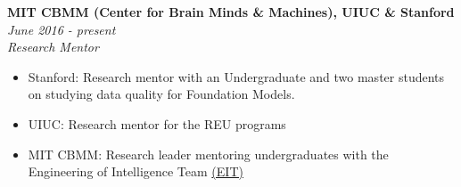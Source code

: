 \documentclass{article}
\newenvironment{changemargin}[2]{%
  \begin{list}{}{%
    \setlength{\topsep}{0pt}%
    \setlength{\leftmargin}{#1}%
    \setlength{\rightmargin}{#2}%
    \setlength{\listparindent}{\parindent}%
    \setlength{\itemindent}{\parindent}%
    \setlength{\parsep}{\parskip}%
  }%
  \item[]}{\end{list}
}
\newenvironment{body} {
	\vspace*{-16pt}
	\begin{changemargin}{-0.25in}{-0.5in}
  }	
	{\end{changemargin}
}
\begin{document}
\begin{body}
	\textbf{MIT CBMM (Center for Brain Minds \& Machines), UIUC \& Stanford} \hfill \emph{June 2016 - present}\\
	\emph{Research Mentor}\\
	\vspace*{-3pt}
	\begin{itemize} \itemsep -2pt  %
        \item Stanford: Research mentor with an Undergraduate and two master students on studying data quality for Foundation Models.
        \item UIUC: Research mentor for the REU programs
        \item MIT CBMM: Research leader mentoring undergraduates with the Engineering of Intelligence Team \href{https://cbmm.mit.edu/eit/people}{(EIT)}
	\end{itemize}
	\vspace{5 pt}
    
    
\end{body}

\newpage
\end{document}
